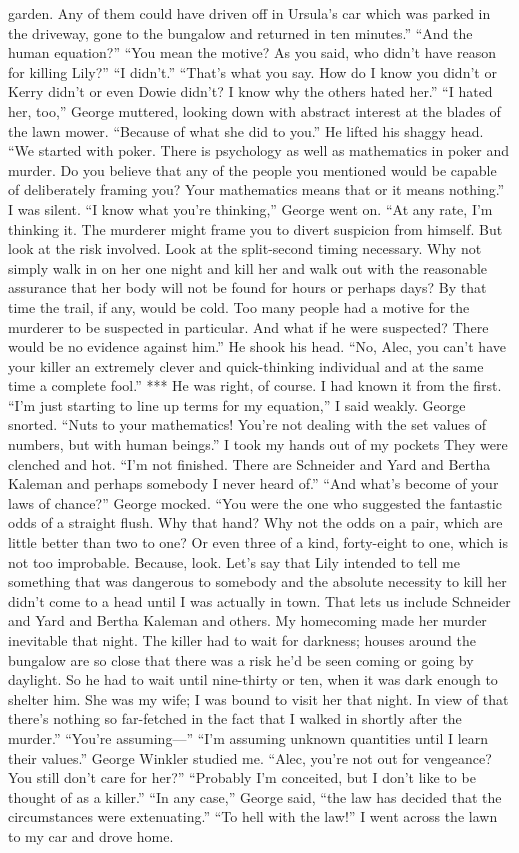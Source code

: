 \documentclass{novel}
\begin{document}
garden. Any of them could have driven off in Ursula’s car which was parked in the driveway, gone to the bungalow and returned in ten minutes.” “And the human equation?” “You mean the motive? As you said, who didn’t have reason for killing Lily?” “I didn’t.” “That’s what you say. How do I know you didn’t or Kerry didn’t or even Dowie didn’t? I know why the others hated her.” “I hated her, too,” George muttered, looking down with abstract interest at the blades of the lawn mower. “Because of what she did to you.” He lifted his shaggy head. “We started with poker. There is psychology as well as mathematics in poker and murder. Do you believe that any of the people you mentioned would be capable of deliberately framing you? Your mathematics means that or it means nothing.” I was silent. “I know what you’re thinking,” George went on. “At any rate, I’m thinking it. The murderer might frame you to divert suspicion from himself. But look at the risk involved. Look at the split-second timing necessary. Why not simply walk in on her one night and kill her and walk out with the reasonable assurance that her body will not be found for hours or perhaps days? By that time the trail, if any, would be cold. Too many people had a motive for the murderer to be suspected in particular. And what if he were suspected? There would be no evidence against him.” He shook his head. “No, Alec, you can’t have your killer an extremely clever and quick-thinking individual and at the same time a complete fool.” *** He was right, of course. I had known it from the first. “I’m just starting to line up terms for my equation,” I said weakly. George snorted. “Nuts to your mathematics! You’re not dealing with the set values of numbers, but with human beings.” I took my hands out of my pockets They were clenched and hot. “I’m not finished. There are Schneider and Yard and Bertha Kaleman and perhaps somebody I never heard of.” “And what’s become of your laws of chance?” George mocked. “You were the one who suggested the fantastic odds of a straight flush. Why that hand? Why not the odds on a pair, which are little better than two to one? Or even three of a kind, forty-eight to one, which is not too improbable. Because, look. Let’s say that Lily intended to tell me something that was dangerous to somebody and the absolute necessity to kill her didn’t come to a head until I was actually in town. That lets us include Schneider and Yard and Bertha Kaleman and others. My homecoming made her murder inevitable that night. The killer had to wait for darkness; houses around the bungalow are so close that there was a risk he’d be seen coming or going by daylight. So he had to wait until nine-thirty or ten, when it was dark enough to shelter him. She was my wife; I was bound to visit her that night. In view of that there’s nothing so far-fetched in the fact that I walked in shortly after the murder.” “You’re assuming—” “I’m assuming unknown quantities until I learn their values.” George Winkler studied me. “Alec, you’re not out for vengeance? You still don’t care for her?” “Probably I’m conceited, but I don’t like to be thought of as a killer.” “In any case,” George said, “the law has decided that the circumstances were extenuating.” “To hell with the law!” I went across the lawn to my car and drove home.
\end{document}
